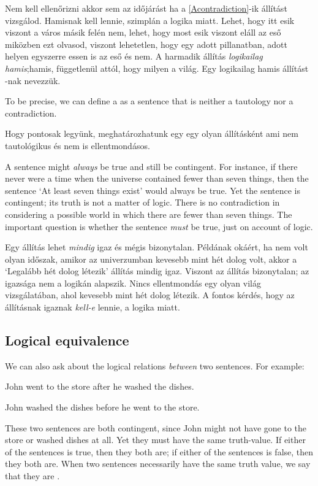 Nem kell ellenőrizni akkor sem az időjárást ha a \ref{Acontradiction}-ik állítást vizsgálod. Hamisnak kell lennie, szimplán a logika miatt. Lehet, hogy itt esik viszont a város másik felén nem, lehet, hogy most esik viszont eláll az eső miközben ezt olvasod, viszont lehetetlen, hogy egy adott pillanatban, adott helyen egyszerre essen is az eső és nem. A harmadik állítás \emph{logikailag hamis};hamis, függetlenül attól, hogy milyen a világ. Egy logikailag hamis állítást -nak nevezzük.

To be precise, we can define a  as a sentence that is neither a tautology nor a contradiction.

Hogy pontosak legyünk, meghatározhatunk egy  egy olyan állításként ami nem tautológikus és nem is ellentmondásos.

A sentence might \emph{always} be true and still be contingent. For instance, if there never were a time when the universe contained fewer than seven things, then the sentence `At least seven things exist' would always be true. Yet the sentence is contingent; its truth is not a matter of logic. There is no contradiction in considering a possible world in which there are fewer than seven things. The important question is whether the sentence \emph{must} be true, just on account of logic.

Egy állítás lehet \emph{mindig} igaz és mégis bizonytalan. Példának okáért, ha nem volt olyan időszak, amikor az univerzumban kevesebb mint hét dolog volt, akkor a `Legalább hét dolog létezik' állítás mindig igaz. Viszont az állítás bizonytalan; az igazsága nem a logikán alapszik. Nincs ellentmondás egy olyan világ vizsgálatában, ahol kevesebb mint hét dolog létezik. A fontos kérdés, hogy az állításnak igaznak \emph{kell-e} lennie, a logika miatt.


\subsection{Logical equivalence}
We can also ask about the logical relations \emph{between} two sentences. For example:
\begin{earg}
\item[] John went to the store after he washed the dishes.
\item[] John washed the dishes before he went to the store.
\end{earg}
These two sentences are both contingent, since John might not have gone to the store or washed dishes at all. Yet they must have the same truth-value. If either of the sentences is true, then they both are; if either of the sentences is false, then they both are. When two sentences necessarily have the same truth value, we say that they are .

